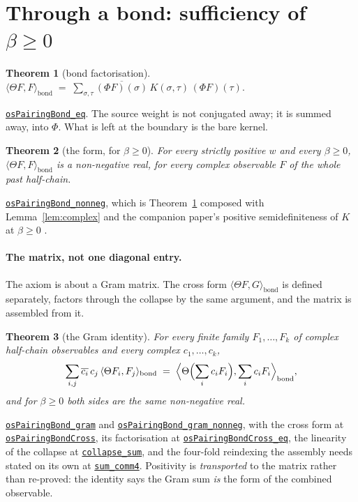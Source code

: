 \documentclass[11pt]{article}
\newtheorem{theorem}{Theorem}[section]
\theoremstyle{definition}
\newcommand{\anchor}{2d0346b2cc75d1cdf2e0ea0cefea4a8ef3be9c84}
\newcommand{\osline}[3]{%
  \href{https://github.com/lluiseriksson/THE-ERIKSSON-PROGRAMME/blob/\anchor/YangMills/OS/#1.lean\#L#2}{\nolinkurl{#3}}}
\begin{document}
\section{Through a bond: sufficiency of $\beta\ge0$}\label{sec:bond}

\begin{theorem}[bond factorisation]\label{thm:bond}
$\displaystyle \langle\Theta F,F\rangle_{\mathrm{bond}}
   \;=\;\sum_{\sigma,\tau}\overline{(\Phi F)(\sigma)}\,K(\sigma,\tau)\,
       (\Phi F)(\tau).$
\end{theorem}

\osline{SpatialOS}{264}{osPairingBond\_eq}.  The source weight is not conjugated
away; it is summed away, into $\Phi$.  What is left at the boundary is the bare
kernel.

\begin{theorem}[the form, for $\beta\ge0$]\label{thm:bondpos}
For every strictly positive $w$ and every $\beta\ge0$, $\langle\Theta
F,F\rangle_{\mathrm{bond}}$ is a non-negative real, for every complex observable
$F$ of the whole past half-chain.
\end{theorem}

\osline{SpatialOS}{320}{osPairingBond\_nonneg}, which is
Theorem~\ref{thm:bond} composed with Lemma~\ref{lem:complex} and the companion
paper's positive semidefiniteness of $K$ at $\beta\ge0$ \cite{ErikssonRefl}.

\paragraph{The matrix, not one diagonal entry.}  The axiom is about a Gram
matrix.  The cross form $\langle\Theta F,G\rangle_{\mathrm{bond}}$ is defined
separately, factors through the collapse by the same argument, and the matrix is
assembled from it.

\begin{theorem}[the Gram identity]\label{thm:gram}
For every finite family $F_1,\dots,F_k$ of complex half-chain observables and
every complex $c_1,\dots,c_k$,
\[
  \sum_{i,j}\overline{c_i}\,c_j\,\langle\Theta F_i,F_j\rangle_{\mathrm{bond}}
  \;=\;\Bigl\langle \Theta\Bigl(\sum_i c_i F_i\Bigr),
                    \sum_i c_i F_i\Bigr\rangle_{\mathrm{bond}},
\]
and for $\beta\ge0$ both sides are the same non-negative real.
\end{theorem}

\osline{SpatialOS}{458}{osPairingBond\_gram} and
\osline{SpatialOS}{487}{osPairingBond\_gram\_nonneg}, with the cross form at
\osline{SpatialOS}{380}{osPairingBondCross}, its factorisation at
\osline{SpatialOS}{406}{osPairingBondCross\_eq}, the linearity of the collapse at
\osline{SpatialOS}{393}{collapse\_sum}, and the four-fold reindexing the assembly
needs stated on its own at \osline{SpatialOS}{353}{sum\_comm4}.  Positivity is
\emph{transported} to the matrix rather than re-proved: the identity says the
Gram sum \emph{is} the form of the combined observable.
\end{document}
